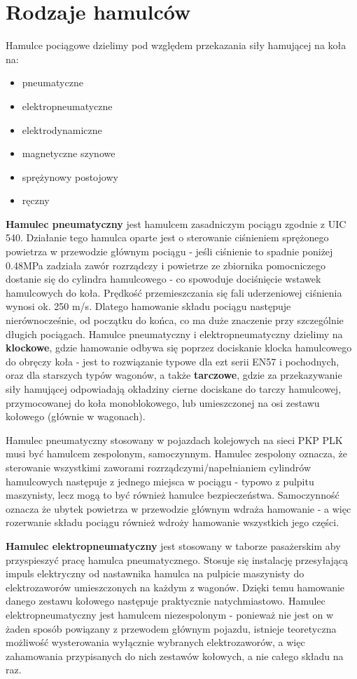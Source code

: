 \chapter{Rodzaje hamulców}

Hamulce pociągowe dzielimy pod względem przekazania siły hamującej na koła na:

\begin{itemize}
	\item pneumatyczne
	\item elektropneumatyczne
	\item elektrodynamiczne
	\item magnetyczne szynowe
	\item sprężynowy postojowy
	\item ręczny 
\end{itemize}

\textbf{Hamulec pneumatyczny} jest hamulcem zasadniczym pociągu zgodnie z UIC 540. Działanie tego hamulca oparte jest o sterowanie ciśnieniem sprężonego powietrza w przewodzie głównym pociągu - jeśli ciśnienie to spadnie poniżej 0.48MPa zadziała zawór rozrządczy i powietrze ze zbiornika pomocniczego dostanie się do cylindra hamulcowego - co spowoduje dociśnięcie wstawek hamulcowych do koła. Prędkość przemieszczania się fali uderzeniowej ciśnienia wynosi ok. 250 m/s. Dlatego hamowanie składu pociągu następuje nierównocześnie, od początku do końca, co ma duże znaczenie przy szczególnie długich pociągach.
Hamulce pneumatyczny i elektropneumatyczny dzielimy na \textbf{klockowe}, gdzie hamowanie odbywa się poprzez dociskanie klocka hamulcowego do obręczy koła - jest to rozwiązanie typowe dla ezt serii EN57 i pochodnych, oraz dla starszych typów wagonów, a także \textbf{tarczowe}, gdzie za przekazywanie siły hamującej odpowiadają okładziny cierne dociskane do tarczy hamulcowej, przymocowanej do koła monoblokowego, lub umieszczonej na osi zestawu kołowego (głównie w wagonach).

Hamulec pneumatyczny stosowany w pojazdach kolejowych na sieci PKP PLK musi być hamulcem zespolonym, samoczynnym. Hamulec zespolony oznacza, że sterowanie wszystkimi zaworami rozrządczymi/napełnianiem cylindrów hamulcowych następuje z jednego miejsca w pociągu - typowo z pulpitu maszynisty, lecz mogą to być również hamulce bezpieczeństwa. Samoczynność oznacza że ubytek powietrza w przewodzie głównym wdraża hamowanie - a więc rozerwanie składu pociągu również wdroży hamowanie wszystkich jego części.

\textbf{Hamulec elektropneumatyczny} jest stosowany w taborze pasażerskim aby przyspieszyć pracę hamulca pneumatycznego. Stosuje się instalację przesyłającą impuls elektryczny od nastawnika hamulca na pulpicie maszynisty do elektrozaworów umieszczonych na każdym z wagonów. Dzięki temu hamowanie danego zestawu kołowego następuje praktycznie natychmiastowo. Hamulec elektropneumatyczny jest hamulcem niezespolonym - ponieważ nie jest on w żaden sposób powiązany z przewodem głównym pojazdu, istnieje teoretyczna możliwość wysterowania wyłącznie wybranych elektrozaworów, a więc zahamowania przypisanych do nich zestawów kołowych, a nie całego składu na raz. 

